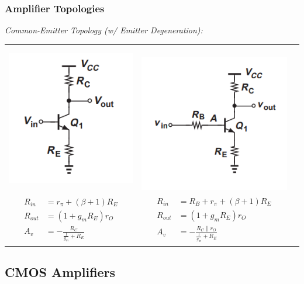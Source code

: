 \documentclass{article}
\begin{document}
\subsubsection{Amplifier Topologies}
\textit{Common-Emitter Topology (w/ Emitter Degeneration):} \\
\begin{tabular}{ccc}
    \includegraphics[scale=0.5]{CE_top.png} & \
    \includegraphics[scale=0.53]{CE_Rb_top.png} \\

    \parbox{6cm}{
        \begin{equation*}
            \begin{split}
                R_{in} &= r_{\pi} + (\beta + 1)R_E \\
                R_{out} &= \left(1 + g_m R_E\right)r_O \\
                A_v &= -\frac{R_C}{\frac{1}{g_m} + R_E}
            \end{split}
        \end{equation*}
    } & \parbox{6cm}{
        \begin{equation*}
            \begin{split}
                R_{in} &= R_B + r_{\pi} + (\beta + 1)R_E \\
                R_{out} &= \left(1 + g_m R_E\right)r_O \\
                A_v &= -\frac{R_C \parallel r_O}{\frac{1}{g_m} + R_E}
            \end{split}
        \end{equation*}
    } 
\end{tabular}
\subsection{CMOS Amplifiers}
\end{document}
